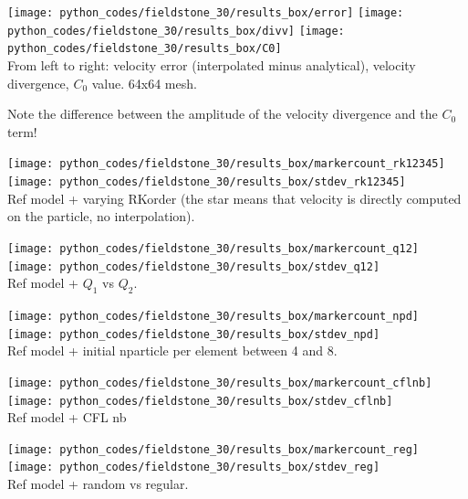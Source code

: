 \begin{center}
\texttt{[image: python\_codes/fieldstone\_30/results\_box/error]}
\texttt{[image: python\_codes/fieldstone\_30/results\_box/divv]}
\texttt{[image: python\_codes/fieldstone\_30/results\_box/C0]}\\
{\captionfont From left to right: velocity error (interpolated minus analytical),
velocity divergence, $C_0$ value. 64x64 mesh. } 
\end{center}
Note the difference between the amplitude of the velocity divergence and the $C_0$ term!

\begin{center}
\texttt{[image: python\_codes/fieldstone\_30/results\_box/markercount\_rk12345]}
\texttt{[image: python\_codes/fieldstone\_30/results\_box/stdev\_rk12345]}\\
{\captionfont Ref model + varying RKorder (the star means that velocity 
is directly computed on the particle, no interpolation).}
\end{center} 

\begin{center}
\texttt{[image: python\_codes/fieldstone\_30/results\_box/markercount\_q12]}
\texttt{[image: python\_codes/fieldstone\_30/results\_box/stdev\_q12]}\\
{\captionfont Ref model + $Q_1$ vs $Q_2$. }
\end{center}

\begin{center}
\texttt{[image: python\_codes/fieldstone\_30/results\_box/markercount\_npd]}
\texttt{[image: python\_codes/fieldstone\_30/results\_box/stdev\_npd]}\\
{\captionfont Ref model + initial nparticle per element between 4 and 8.}
\end{center}

\begin{center}
\texttt{[image: python\_codes/fieldstone\_30/results\_box/markercount\_cflnb]}
\texttt{[image: python\_codes/fieldstone\_30/results\_box/stdev\_cflnb]}\\
{\captionfont Ref model + CFL nb}
\end{center}

\begin{center}
\texttt{[image: python\_codes/fieldstone\_30/results\_box/markercount\_reg]}
\texttt{[image: python\_codes/fieldstone\_30/results\_box/stdev\_reg]}\\
{\captionfont Ref model + random vs regular.} 
\end{center}

